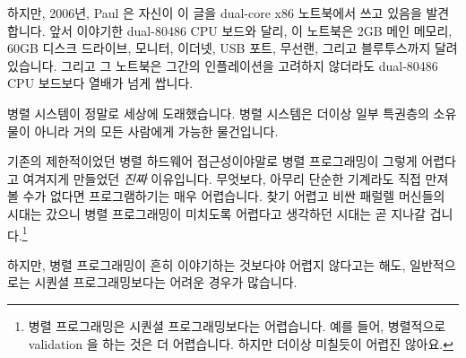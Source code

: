 {	하지만, 2006년, Paul 은 자신이 이 글을 dual-core x86 노트북에서 쓰고
	있음을 발견합니다.
	앞서 이야기한 dual-80486 CPU 보드와 달리, 이 노트북은 2GB 메인 메모리,
	60GB 디스크 드라이브, 모니터, 이더넷, USB 포트, 무선랜, 그리고
	블루투스까지 달려 있습니다.
	그리고 그 노트북은 그간의 인플레이션을 고려하지 않더라도 dual-80486 CPU
	보드보다 열배가 넘게 쌉니다.

	병렬 시스템이 정말로 세상에 도래했습니다.
	병렬 시스템은 더이상 일부 특권층의 소유물이 아니라 거의 모든 사람에게
	가능한 물건입니다.

	기존의 제한적이었던 병렬 하드웨어 접근성이야말로 병렬 프로그래밍이
	그렇게 어렵다고 여겨지게 만들었던 \emph{진짜} 이유입니다.
	무엇보다, 아무리 단순한 기계라도 직접 만져볼 수가 없다면 프로그램하기는
	매우 어렵습니다.
	찾기 어렵고 비싼 패럴렐 머신들의 시대는 갔으니 병렬 프로그래밍이
	미치도록 어렵다고 생각하던 시대는 곧 지나갈 겁니다.\footnote{
		병렬 프로그래밍은 시퀀셜 프로그래밍보다는 어렵습니다. 예를
		들어, 병렬적으로 validation 을 하는 것은 더 어렵습니다.
		하지만 더이상 미칠듯이 어렵진 않아요.}

} \QuickQuizEnd

하지만, 병렬 프로그래밍이 흔히 이야기하는 것보다야 어렵지 않다고는 해도,
일반적으로는 시퀀셜 프로그래밍보다는 어려운 경우가 많습니다.

